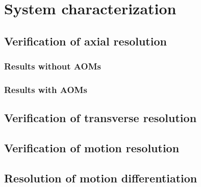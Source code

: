 \chapter{System characterization}

\section{Verification of axial resolution}

\subsection{Results without AOMs}

\subsection{Results with AOMs}

\section{Verification of transverse resolution}

\section{Verification of motion resolution}

\section{Resolution of motion differentiation}
